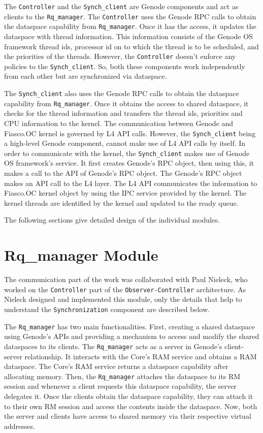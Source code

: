 The \texttt{Controller} and the \texttt{Synch\_client} are Genode components and act as clients to the \texttt{Rq\_manager}. The \texttt{Controller} uses the Genode RPC calls to obtain the dataspace capability from \texttt{Rq\_manager}. Once it has the access, it updates the dataspace with thread information. This information consists of the Genode OS framework thread ids, processor id on to which the thread is to be scheduled, and the priorities of the threads. However, the \texttt{Controller} doesn't enforce any policies to the \texttt{Synch\_client}. So, both these components work independently from each other but are synchronized via dataspace.

The \texttt{Synch\_client} also uses the Genode RPC calls to obtain the dataspace capability from \texttt{Rq\_manager}. Once it obtains the access to shared dataspace, it checks for the thread information and transfers the thread ids, priorities and CPU information to the kernel. The communication between Genode and Fiasco.OC kernel is governed by L4 API calls. However, the \texttt{Synch\_client} being a high-level Genode component, cannot make use of L4 API calls by itself. In order to communicate with the kernel, the \texttt{Synch\_client} makes use of Genode OS framework's service. It first creates Genode's RPC object, then using this, it makes a call to the API of Genode's RPC object. The Genode's RPC object makes an API call to the L4 layer. The L4 API communicates the information to Fiasco.OC kernel object by using the IPC service provided by the kernel. The kernel threads are identified by the kernel and updated to the ready queue.

The following sections give detailed design of the individual modules.

\section{Rq\_manager Module}\label{rqmodule}
The communication part of the work was collaborated with Paul Nieleck, who worked on the \texttt{Controller} part of the \texttt{Observer-Controller} architecture\cite{paul}. As Nieleck designed and implemented this module, only the details that help to understand the \texttt{Synchronization} component are described below. 

The \texttt{Rq\_manager} has two main functionalities. First, creating a shared dataspace using Genode's APIs and providing a mechanism to access and modify the shared dataspaces to its clients. The \texttt{Rq\_manager} acts as a server in Genode's client-server relationship. It interacts with the Core's RAM service and obtains a RAM dataspace. The Core’s RAM service returns a dataspace capability after allocating memory. Then, the \texttt{Rq\_manager} attaches the dataspace to its RM session and whenever a client requests this dataspace capability, the server delegates it. Once the clients obtain the dataspace capability, they can attach it to their own RM session and access the contents inside the dataspace. Now, both the server and clients have access to shared memory via their respective virtual addresses.

